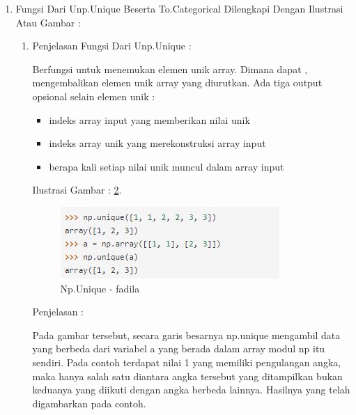 \begin{enumerate}
\begin{itemize}
\begin{enumerate}
\begin{figure}[!hbtp]
\caption{One-Hot Encoding 2 - fadila}
\label{one-hot-en-3-fadila}
\end{figure}
\par
\par Penjelasan :
\par Pada gambar tersebut dijelaskan bahwa terdapat bilangan bulat yang kemudian dikodekan sebagai vektor biner dan dicetak. Kemudian dapat dilihat bahwa nilai integer pertama 1 dikodekan sebagai [0, 1, 0, 0].Selanjutnya membalikkan pengkodean dengan menggunakan fungsi argumax NumPy () pada nilai pertama dalam urutan yang mengembalikan nilai yang diharapkan 1 untuk bilangan bulat pertama.
\end{enumerate}
\end{itemize}
\par
\par
\item Fungsi Dari Unp.Unique Beserta To.Categorical Dilengkapi Dengan Ilustrasi Atau Gambar :
\begin{enumerate}
\item Penjelasan Fungsi Dari Unp.Unique :
\par Berfungsi untuk menemukan elemen unik array. Dimana dapat , mengembalikan elemen unik array yang diurutkan. Ada tiga output opsional selain elemen unik :
\begin{itemize}
\item indeks array input yang memberikan nilai unik
\item indeks array unik yang merekonstruksi array input
\item berapa kali setiap nilai unik muncul dalam array input
\end{itemize}
\par
\par Ilustrasi Gambar : \ref{np-unique-fadila}.
\par
\begin{figure}[!hbtp]
\centering
\includegraphics[scale=0.2]{figures/np-unique-fadila.jpg}
\caption{Np.Unique - fadila}
\label{np-unique-fadila}
\end{figure}
\par
\par Penjelasan :
\par Pada gambar tersebut, secara garis besarnya np.unique mengambil data yang berbeda dari variabel a yang berada dalam array modul np itu sendiri. Pada contoh terdapat nilai 1 yang memiliki pengulangan angka, maka hanya salah satu diantara angka tersebut yang ditampilkan bukan keduanya yang diikuti dengan angka berbeda lainnya. Hasilnya yang telah digambarkan pada contoh.

\end{enumerate}
\end{enumerate}
